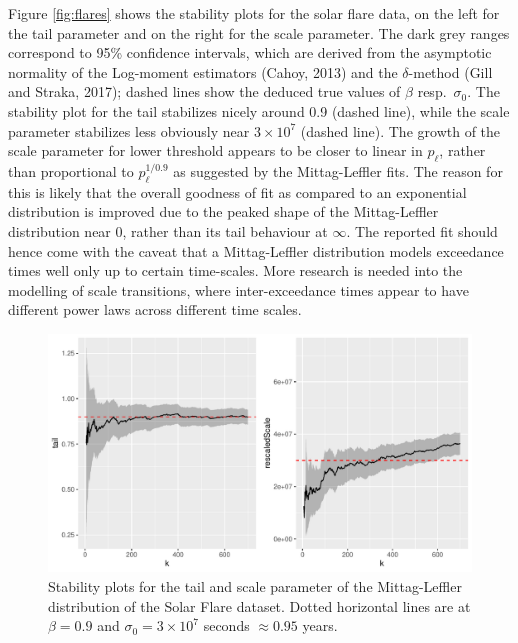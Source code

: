 \documentclass[]{elsarticle} %
\begin{document}
Figure \ref{fig:flares} shows the stability plots for the solar flare
data, on the left for the tail parameter and on the right for the scale
parameter. The dark grey ranges correspond to 95\% confidence intervals,
which are derived from the asymptotic normality of the Log-moment
estimators (Cahoy, 2013) and the \(\delta\)-method (Gill and Straka,
2017); dashed lines show the deduced true values of \(\beta\)
resp.~\(\sigma_0\). The stability plot for the tail stabilizes nicely
around 0.9 (dashed line), while the scale parameter stabilizes less
obviously near \(3 \times 10^7\) (dashed line). The growth of the scale
parameter for lower threshold appears to be closer to linear in
\(p_{\ell}\), rather than proportional to \(p_{\ell}^{1/0.9}\) as
suggested by the Mittag-Leffler fits. The reason for this is likely that
the overall goodness of fit as compared to an exponential distribution
is improved due to the peaked shape of the Mittag-Leffler distribution
near \(0\), rather than its tail behaviour at \(\infty\). The reported
fit should hence come with the caveat that a Mittag-Leffler distribution
models exceedance times well only up to certain time-scales. More
research is needed into the modelling of scale transitions, where
inter-exceedance times appear to have different power laws across
different time scales.

\begin{figure}
\includegraphics[width=\textwidth]{article_springer_files/figure-latex/solar-flare-tail-scale-1} \caption{\label{fig:flares} Stability plots for the tail and scale parameter of the Mittag-Leffler distribution of the Solar Flare dataset. Dotted horizontal lines are at $\beta = 0.9$ and $\sigma_0 = 3 \times 10^7$ seconds $\approx 0.95$ years.}\label{fig:solar-flare-tail-scale}
\end{figure}
\end{document}
